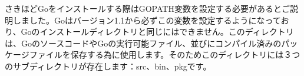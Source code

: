さきほどGoをインストールする際はGOPATH変数を設定する必要があるとご説明しました。Goはバージョン1.1から必ずこの変数を設定するようになっており、Goのインストールディレクトリと同じにはできません。このディレクトリは、GoのソースコードやGoの実行可能ファイル、並びにコンパイル済みのパッケージファイルを保存する為に使用します。そのためこのディレクトリには３つのサブディレクトリが存在します：src、bin、pkgです。
